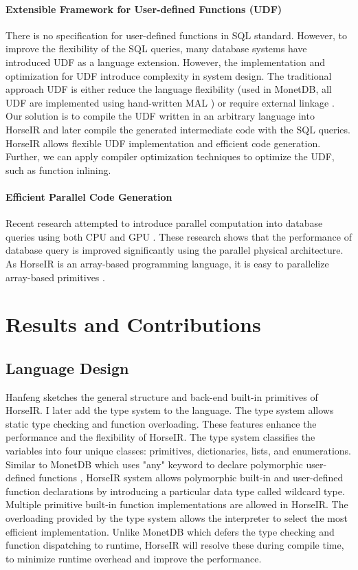 \documentclass[sigplan]{acmart}
\begin{document}
\paragraph{Extensible Framework for User-defined Functions (UDF)}
There is no specification for user-defined functions in SQL standard. However,
to improve the flexibility of the SQL queries, many database systems have
introduced UDF as a language extension. However, the implementation and
optimization for UDF introduce complexity in system design. The traditional
approach UDF is either reduce the language flexibility (used in MonetDB, all
UDF are implemented using hand-written MAL \cite{MALUDF}) or require external
linkage \cite{ExternUDF}. Our solution is to compile the UDF written in an
arbitrary language into HorseIR and later compile the generated intermediate
code with the SQL queries. HorseIR allows flexible UDF implementation and
efficient code generation. Further, we can apply compiler optimization
techniques to optimize the UDF, such as function inlining.

\paragraph{Efficient Parallel Code Generation}
Recent research attempted to introduce parallel computation into database
queries using both CPU\cite{DBLP:conf/sigmod/PolychroniouRR15,
DBLP:conf/sigmod/ZhouR02} and GPU \cite{DBLP:conf/ica3pp/CremerBMM16}.
These research shows that the performance of database query is improved
significantly using the parallel physical architecture. As HorseIR is an
array-based programming language, it is easy to parallelize array-based
primitives \cite{DBLP:conf/pldi/ImamSLK14}.


\section{Results and Contributions}
\subsection*{Language Design}
Hanfeng sketches the general structure and back-end built-in primitives of
HorseIR. I later add the type system to the language. The type system allows
static type checking and function overloading. These features enhance the
performance and the flexibility of HorseIR. The type system classifies the
variables into four unique classes: primitives, dictionaries, lists, and
enumerations.  Similar to MonetDB which uses "any" keyword to declare
polymorphic user-defined functions \cite{MonetDBPolymorphism}, HorseIR system
allows polymorphic built-in and user-defined function declarations by
introducing a particular data type called wildcard type. Multiple primitive
built-in function implementations are allowed in HorseIR. The overloading
provided by the type system allows the interpreter to select the most efficient
implementation. Unlike MonetDB which defers the type checking and function
dispatching to runtime, HorseIR will resolve these during compile time, to
minimize runtime overhead and improve the performance.
\end{document}
